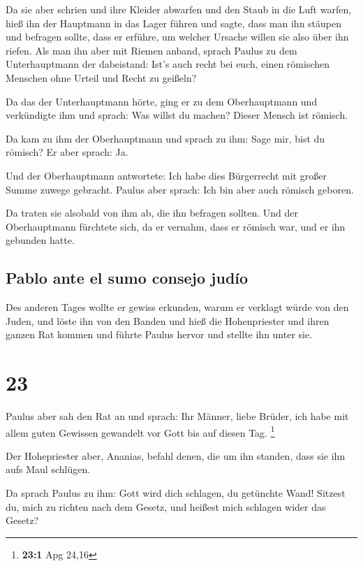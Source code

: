  Da sie aber schrien und ihre Kleider abwarfen und den
Staub in die Luft warfen,  hieß ihn der Hauptmann in das
Lager führen und sagte, dass man ihn stäupen und befragen sollte, dass
er erführe, um welcher Ursache willen sie also über ihn riefen.
 Als man ihn aber mit Riemen anband, sprach Paulus zu dem
Unterhauptmann der dabeistand: Ist's auch recht bei euch, einen
römischen Menschen ohne Urteil und Recht zu geißeln?

 Da das der Unterhauptmann hörte, ging er zu dem
Oberhauptmann und verkündigte ihm und sprach: Was willst du machen?
Dieser Mensch ist römisch.

 Da kam zu ihm der Oberhauptmann und sprach zu ihm: Sage
mir, bist du römisch? Er aber sprach: Ja.

 Und der Oberhauptmann antwortete: Ich habe dies
Bürgerrecht mit großer Summe zuwege gebracht. Paulus aber sprach: Ich
bin aber auch römisch geboren.

 Da traten sie alsobald von ihm ab, die ihn befragen
sollten. Und der Oberhauptmann fürchtete sich, da er vernahm, dass er
römisch war, und er ihn gebunden hatte.

\hypertarget{pablo-ante-el-sumo-consejo-juduxedo}{%
\subsection{Pablo ante el sumo consejo
judío}\label{pablo-ante-el-sumo-consejo-juduxedo}}

 Des anderen Tages wollte er gewiss erkunden, warum er
verklagt würde von den Juden, und löste ihn von den Banden und hieß die
Hohenpriester und ihren ganzen Rat kommen und führte Paulus hervor und
stellte ihn unter sie.

\hypertarget{section-22}{%
\section{23}\label{section-22}}

 Paulus aber sah den Rat an und sprach: Ihr Männer, liebe
Brüder, ich habe mit allem guten Gewissen gewandelt vor Gott bis auf
diesen Tag. \footnote{\textbf{23:1} Apg 24,16}

 Der Hohepriester aber, Ananias, befahl denen, die um ihn
standen, dass sie ihn aufs Maul schlügen.

 Da sprach Paulus zu ihm: Gott wird dich schlagen, du
getünchte Wand! Sitzest du, mich zu richten nach dem Gesetz, und heißest
mich schlagen wider das Gesetz?

